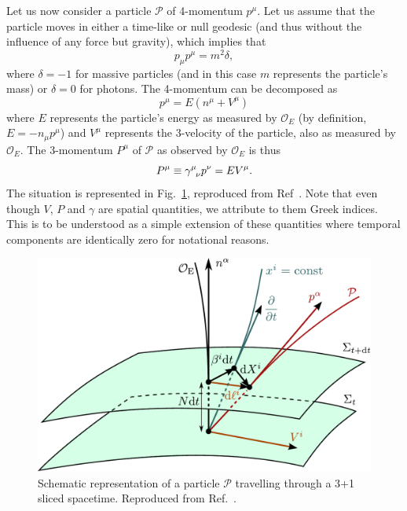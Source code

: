 Let us now consider a particle $\mathcal{P}$ of 4-momentum $p^\mu$. Let us assume that the particle moves in either a time-like or null geodesic (and thus without the influence of any force but gravity), which implies that
%
\begin{equation}
  p_\mu p^\mu = m^2\delta,
  \label{eq:arbitrary_penrose_p_norm}
\end{equation}
% 
where $\delta = -1$ for massive particles (and in this case $m$ represents the particle's mass) or $\delta=0$ for photons. The 4-momentum can be decomposed as
%
\begin{equation}
  p^\mu = E(n^\mu + V^\mu)
  \label{eq:arbitrary_penrose_p_decomp}
\end{equation}
%
where $E$ represents the particle's energy as measured by $\mathcal{O}_E$ (by definition,  $E = - n_\mu p^\mu$) and $V^\mu$ represents the 3-velocity of the particle, also as measured by $\mathcal{O}_E$. The 3-momentum $P^\mu$ of $\mathcal{P}$ as observed by $\mathcal{O}_E$ is thus
%
\begin{equation}
  P^\mu \equiv \tens{\gamma}{\mu}{\nu} p^\nu = E V^\mu.
  \label{eq:arbitrary_penrose_3_momentum}
\end{equation}
%
The situation is represented in Fig.~\ref{fig:arbitrary_penrose_slicing}, reproduced from Ref~\cite{Vincent_2012}. Note that even though $V$, $P$ and $\gamma$ are spatial quantities, we attribute to them Greek indices. This is to be understood as a simple extension of these quantities where temporal components are identically zero for notational reasons.

\begin{figure}[!ht]
  \centering
  \includegraphics[width=0.6\linewidth]{img/penrose_binaries/slicing.pdf}
  \caption{Schematic representation of a particle $\mathcal{P}$ travelling through a 3+1 sliced spacetime. Reproduced from Ref.~\cite{Vincent_2012}.}
  \label{fig:arbitrary_penrose_slicing}
\end{figure}

